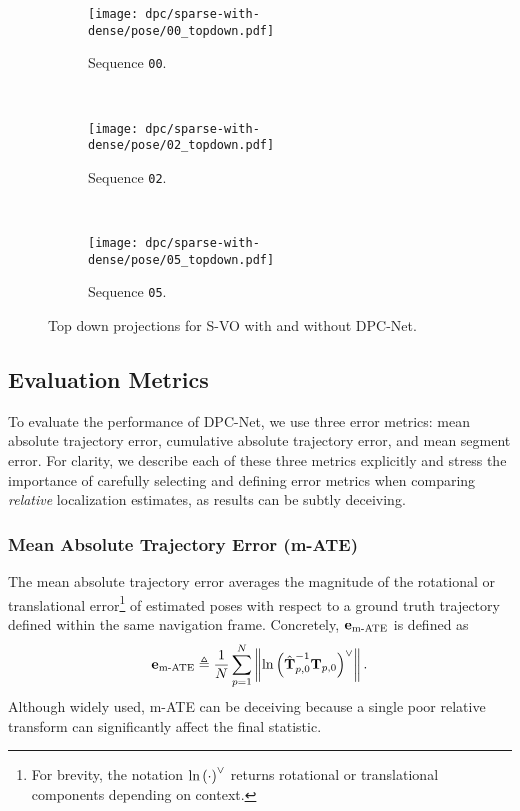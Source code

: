 \begin{figure}
    \centering
    \begin{subfigure}{0.42\textwidth}
        \texttt{[image: dpc/sparse-with-dense/pose/00\_topdown.pdf]}
        \label{00-top-down}
        \caption{Sequence \texttt{00}.}
    \end{subfigure}
    ~
    \begin{subfigure}{0.42\textwidth}
        \texttt{[image: dpc/sparse-with-dense/pose/02\_topdown.pdf]}
        \label{02-top-down}
        \caption{Sequence \texttt{02}.}
    \end{subfigure}
    ~
    \begin{subfigure}{0.42\textwidth}
        \texttt{[image: dpc/sparse-with-dense/pose/05\_topdown.pdf]}
        \label{05-top-down}
        \caption{Sequence \texttt{05}.}
    \end{subfigure}
   \caption{Top down projections for S-VO with and without DPC-Net.}
  \label{fig:top-downs} 
\end{figure}

\subsection{Evaluation Metrics}
To evaluate the performance of DPC-Net, we use three error metrics: mean absolute trajectory error, cumulative absolute trajectory error, and mean segment error. For clarity, we describe each of these three metrics explicitly and stress the importance of carefully selecting and defining error metrics when comparing \textit{relative} localization estimates, as results can be subtly deceiving.

\subsubsection{Mean Absolute Trajectory Error (m-ATE)} The mean absolute trajectory error averages the magnitude of the rotational or translational error\footnote{For brevity, the notation $\text{ln}\left({\cdot} \right)^{\vee}$ returns rotational or translational components depending on context.} of estimated poses with respect to a ground truth trajectory defined within the same navigation frame. Concretely, $\boldsymbol{\mathbf{e}}_\text{m-ATE}$ is defined as
\begin{equation}
	\boldsymbol{\mathbf{e}}_\text{m-ATE} \triangleq \frac{1}{N} \sum_{p=1}^{N} \left\Vert\text{ln}\left({\hat{\boldsymbol{\mathbf{T}}}^{-1}_{p,0} \boldsymbol{\mathbf{T}}_{p,0}} \right)^{\vee}\right\Vert.
\end{equation}
Although widely used, m-ATE can be deceiving because a single poor relative transform can significantly affect the final statistic.


